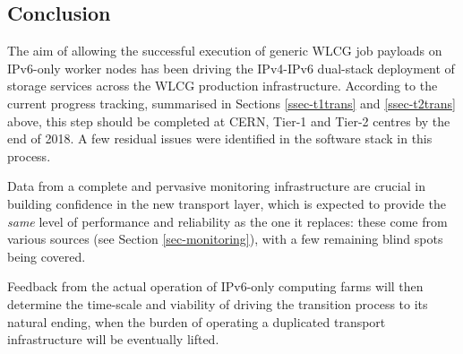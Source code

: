 \subsection{Conclusion}
The aim of allowing the successful execution of generic WLCG job payloads
on IPv6-only worker nodes has been driving the IPv4-IPv6 dual-stack deployment
of storage services across the WLCG production infrastructure. According to
the current progress tracking, summarised in Sections \ref{ssec-t1trans} and
\ref{ssec-t2trans} above, this step should be completed at CERN, Tier-1
and Tier-2 centres by the end of 2018. A few residual
issues were identified in the software stack in this process.
\par
Data from
a complete and pervasive monitoring infrastructure are crucial in building
confidence in the new transport layer, which is expected to provide the
{\it same} level of performance and reliability as the one it replaces: these
come from various sources (see Section \ref{sec-monitoring}), with a few
remaining blind spots being covered.
\par
Feedback from the actual operation of  
IPv6-only computing farms will then determine the time-scale and viability of
driving the transition process to its natural ending, when the burden
of operating a duplicated transport infrastructure will be eventually lifted.

